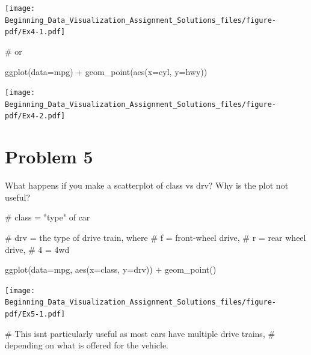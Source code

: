 \documentclass[
  letterpaper,
  DIV=11,
  numbers=noendperiod]{scrreprt}
\newenvironment{Shaded}{\begin{snugshade}}{\end{snugshade}}
\newcommand{\AttributeTok}[1]{\textcolor[rgb]{0.40,0.45,0.13}{#1}}
\newcommand{\CommentTok}[1]{\textcolor[rgb]{0.37,0.37,0.37}{#1}}
\newcommand{\FunctionTok}[1]{\textcolor[rgb]{0.28,0.35,0.67}{#1}}
\newcommand{\NormalTok}[1]{\textcolor[rgb]{0.00,0.23,0.31}{#1}}
\newcommand{\SpecialCharTok}[1]{\textcolor[rgb]{0.37,0.37,0.37}{#1}}
\begin{document}
\texttt{[image: Beginning\_Data\_Visualization\_Assignment\_Solutions\_files/figure-pdf/Ex4-1.pdf]}

\begin{Shaded}
\begin{Highlighting}[]
\CommentTok{\# or}

\FunctionTok{ggplot}\NormalTok{(}\AttributeTok{data=}\NormalTok{mpg) }\SpecialCharTok{+}
  \FunctionTok{geom\_point}\NormalTok{(}\FunctionTok{aes}\NormalTok{(}\AttributeTok{x=}\NormalTok{cyl, }\AttributeTok{y=}\NormalTok{hwy))}
\end{Highlighting}
\end{Shaded}

\texttt{[image: Beginning\_Data\_Visualization\_Assignment\_Solutions\_files/figure-pdf/Ex4-2.pdf]}

\section*{Problem 5}\label{problem-5-3}


What happens if you make a scatterplot of class vs drv? Why is the plot
not useful?

\begin{Shaded}
\begin{Highlighting}[]
\CommentTok{\# class = "type" of car}

\CommentTok{\# drv = the type of drive train, where }
\CommentTok{\#       f = front{-}wheel drive, }
\CommentTok{\#       r = rear wheel drive, }
\CommentTok{\#       4 = 4wd}

\FunctionTok{ggplot}\NormalTok{(}\AttributeTok{data=}\NormalTok{mpg, }\FunctionTok{aes}\NormalTok{(}\AttributeTok{x=}\NormalTok{class, }\AttributeTok{y=}\NormalTok{drv)) }\SpecialCharTok{+}
  \FunctionTok{geom\_point}\NormalTok{()}
\end{Highlighting}
\end{Shaded}

\texttt{[image: Beginning\_Data\_Visualization\_Assignment\_Solutions\_files/figure-pdf/Ex5-1.pdf]}

\begin{Shaded}
\begin{Highlighting}[]
\CommentTok{\# This isn\textquotesingle{}t particularly useful as most cars have multiple drive trains,}
\CommentTok{\# depending on what is offered for the vehicle.}
\end{Highlighting}
\end{Shaded}
\end{document}
